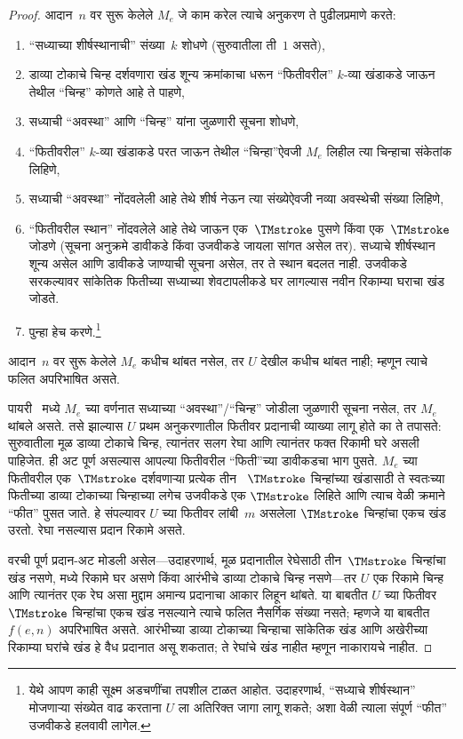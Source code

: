 \documentclass[../../../include/open-logic-section]{subfiles}
\begin{document}
\begin{proof}
  आदान~$n$ वर सुरू केलेले $M_e$ जे काम
  करेल त्याचे अनुकरण ते पुढीलप्रमाणे करते:
  \begin{enumerate}
    \item “सध्याच्या शीर्षस्थानाची” संख्या~$k$ शोधणे
    (सुरुवातीला ती~$1$ असते),
    \item डाव्या टोकाचे चिन्ह दर्शवणारा खंड शून्य क्रमांकाचा धरून
    “फितीवरील” $k$-व्या खंडाकडे जाऊन
    तेथील “चिन्ह” कोणते आहे ते पाहणे,
    \item{}%
    सध्याची “अवस्था” आणि “चिन्ह” यांना जुळणारी
    सूचना शोधणे,
    \item “फितीवरील” $k$-व्या खंडाकडे
    परत जाऊन तेथील “चिन्हा”ऐवजी $M_e$ लिहील
    त्या चिन्हाचा संकेतांक लिहिणे,
    \item सध्याची “अवस्था” नोंदवलेली आहे
    तेथे शीर्ष नेऊन त्या संख्येऐवजी नव्या
    अवस्थेची संख्या लिहिणे,
    \item “फितीवरील स्थान” नोंदवलेले आहे
    तेथे जाऊन एक~$\TMstroke$ पुसणे किंवा
    एक~$\TMstroke$ जोडणे (सूचना अनुक्रमे
    डावीकडे किंवा उजवीकडे जायला सांगत असेल तर). सध्याचे
    शीर्षस्थान शून्य असेल आणि डावीकडे जाण्याची सूचना असेल,
    तर ते स्थान बदलत नाही. उजवीकडे सरकल्यावर सांकेतिक फितीच्या
    सध्याच्या शेवटापलीकडे घर लागल्यास नवीन रिकाम्या घराचा खंड जोडते.
    \item पुन्हा हेच करणे.\footnote{येथे आपण काही सूक्ष्म
    अडचणींचा तपशील टाळत आहोत. उदाहरणार्थ,
    “सध्याचे शीर्षस्थान” मोजणाऱ्या संख्येत
    वाढ करताना $U$ ला अतिरिक्त जागा लागू शकते;
    अशा वेळी त्याला संपूर्ण “फीत” उजवीकडे
    हलवावी लागेल.}
  \end{enumerate}
  आदान~$n$ वर सुरू केलेले $M_e$ कधीच थांबत
  नसेल, तर $U$ देखील कधीच थांबत नाही;
  म्हणून त्याचे फलित अपरिभाषित असते.

  पायरी~ मध्ये $M_e$ च्या
  वर्णनात सध्याच्या “अवस्था”/“चिन्ह” जोडीला
  जुळणारी सूचना नसेल, तर $M_e$ थांबले असते.
  तसे झाल्यास $U$ प्रथम अनुकरणातील फितीवर प्रदानाची व्याख्या
  लागू होते का ते तपासते: सुरुवातीला मूळ डाव्या टोकाचे चिन्ह,
  त्यानंतर सलग रेघा आणि त्यानंतर फक्त रिकामी घरे असली पाहिजेत.
  ही अट पूर्ण असल्यास आपल्या फितीवरील “फिती”च्या
  डावीकडचा भाग पुसते. $M_e$ च्या फितीवरील
  एक~$\TMstroke$ दर्शवणाऱ्या प्रत्येक तीन
  ~$\TMstroke$ चिन्हांच्या खंडासाठी ते
  स्वतःच्या फितीच्या डाव्या टोकाच्या चिन्हाच्या लगेच उजवीकडे एक
  $\TMstroke$ लिहिते आणि त्याच वेळी क्रमाने
  “फीत” पुसत जाते. हे संपल्यावर $U$ च्या
  फितीवर लांबी~$m$ असलेला $\TMstroke$
  चिन्हांचा एकच खंड उरतो. रेघा नसल्यास प्रदान रिकामे असते.

  वरची पूर्ण प्रदान-अट मोडली असेल—उदाहरणार्थ, मूळ प्रदानातील
  रेघेसाठी तीन~$\TMstroke$ चिन्हांचा खंड नसणे, मध्ये रिकामे घर
  असणे किंवा आरंभीचे डाव्या टोकाचे चिन्ह नसणे—तर $U$
  एक रिकामे चिन्ह आणि त्यानंतर एक रेघ असा मुद्दाम अमान्य
  प्रदानाचा आकार लिहून थांबते. या बाबतीत $U$ च्या फितीवर
  $\TMstroke$ चिन्हांचा एकच खंड नसल्याने
  त्याचे फलित नैसर्गिक संख्या नसते; म्हणजे
  या बाबतीत $f(e,n)$ अपरिभाषित असते. आरंभीच्या डाव्या टोकाच्या
  चिन्हाचा सांकेतिक खंड आणि अखेरीच्या रिकाम्या घरांचे खंड
  हे वैध प्रदानात असू शकतात; ते रेघांचे खंड नाहीत म्हणून नाकारायचे नाहीत.
%
\end{proof}
\end{document}
